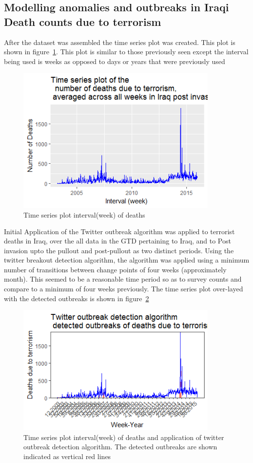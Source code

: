\subsection{Modelling anomalies and outbreaks in Iraqi Death counts due to terrorism}
After the dataset was assembled the time series plot was created. This plot is shown in figure~\ref{fig:tseriesweek}. This plot is similar to those previously seen except the interval being used is weeks as opposed to days or years that were previously used

\begin{figure}[t]
\includegraphics[width=10cm]{Peters_experiment_markdown_files/figure-latex/Rplot03_weekly_death_counts_iraq.png}
\caption{Time series plot interval(week) of deaths}
\label{fig:tseriesweek}
\centering
\end{figure}

Initial Application of the Twitter outbreak algorithm was applied to terrorist deaths in Iraq, over the all data in the GTD pertaining to Iraq, and to Post invasion upto the pullout and post-pullout as two distinct periods. Using the twitter breakout detection algorithm, the algorithm was applied using a minimum number of transitions between change points of four weeks (approximately month). This seemed to be a reasonable time period so as to survey counts and compare to a minimum of four weeks previously. The time series plot over-layed with the detected outbreaks is shown in figure~\ref{fig:tseriesweektwitter outbreak} 

\begin{figure}[t]
\includegraphics[width=10cm]{Peters_experiment_markdown_files/figure-latex/Rplot02_Twitter_outbreak_detection_algo.png}
\caption{Time series plot interval(week) of deaths and application of twitter outbreak detection algorithm. The detected outbreaks are shown indicated as vertical red lines}
\label{fig:tseriesweektwitter outbreak}
\centering
\end{figure}

